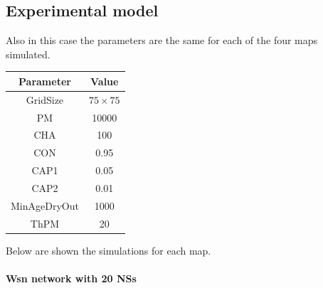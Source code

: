 \subsection{Experimental model}

Also in this case the parameters are the same for each of the four maps simulated.

\begin{center}
 \begin{tabular}{||c c||} 
 \hline
 Parameter & Value \\ [0.5ex] 
 \hline\hline
 GridSize & $75 \times 75$ \\ 
 \hline
 PM & 10000 \\ 
 \hline
 CHA & 100 \\ 
 \hline
 CON & 0.95 \\ 
 \hline
 CAP1 & 0.05 \\ 
 \hline
 CAP2 & 0.01 \\ 
 \hline
 MinAgeDryOut & 1000 \\
 \hline
 ThPM & 20 \\ [1ex] 
 \hline
 \end{tabular}
\end{center}

Below are shown the simulations for each map. 

\paragraph{Wsn network with 20 NSs}

